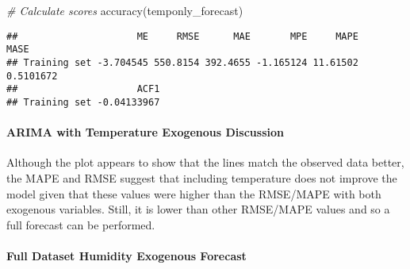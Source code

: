 \documentclass[
]{article}
\newenvironment{Shaded}{\begin{snugshade}}{\end{snugshade}}
\newcommand{\CommentTok}[1]{\textcolor[rgb]{0.56,0.35,0.01}{\textit{#1}}}
\newcommand{\FunctionTok}[1]{\textcolor[rgb]{0.00,0.00,0.00}{#1}}
\newcommand{\NormalTok}[1]{#1}
\newcommand{\OtherTok}[1]{\textcolor[rgb]{0.56,0.35,0.01}{#1}}
\newcommand{\SpecialCharTok}[1]{\textcolor[rgb]{0.00,0.00,0.00}{#1}}
\begin{document}
\begin{Shaded}
\begin{Highlighting}[]
\CommentTok{\# Calculate scores}
\FunctionTok{accuracy}\NormalTok{(temponly\_forecast)}
\end{Highlighting}
\end{Shaded}

\begin{verbatim}
##                     ME     RMSE      MAE       MPE     MAPE      MASE
## Training set -3.704545 550.8154 392.4655 -1.165124 11.61502 0.5101672
##                     ACF1
## Training set -0.04133967
\end{verbatim}

\begin{Shaded}
\end{Shaded}

\hypertarget{arima-with-temperature-exogenous-discussion}{%
\paragraph{ARIMA with Temperature Exogenous
Discussion}\label{arima-with-temperature-exogenous-discussion}}

Although the plot appears to show that the lines match the observed data
better, the MAPE and RMSE suggest that including temperature does not
improve the model given that these values were higher than the RMSE/MAPE
with both exogenous variables. Still, it is lower than other RMSE/MAPE
values and so a full forecast can be performed.

\hypertarget{full-dataset-humidity-exogenous-forecast}{%
\paragraph{Full Dataset Humidity Exogenous
Forecast}\label{full-dataset-humidity-exogenous-forecast}}
\end{document}
